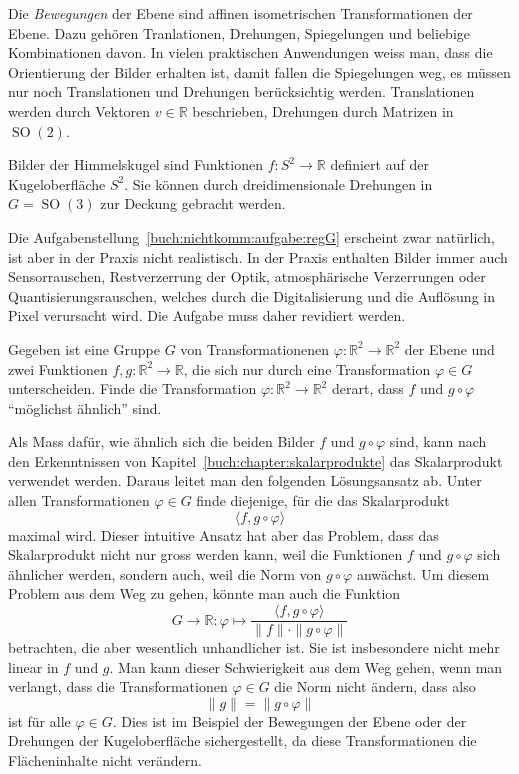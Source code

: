 \begin{beispiel}
Die {\em Bewegungen} der Ebene sind affinen isometrischen
%
Transformationen der Ebene.
Dazu gehören Tranlationen, Drehungen, Spiegelungen und beliebige
%
%
%
Kombinationen davon.
In vielen praktischen Anwendungen weiss man, dass die Orientierung
der Bilder erhalten ist, damit fallen die Spiegelungen weg, es
müssen nur noch Translationen und Drehungen berücksichtig werden.
Translationen werden durch Vektoren $v\in\mathbb{R}$ beschrieben,
Drehungen durch Matrizen in $\operatorname{SO}(2)$.
\end{beispiel}

\begin{beispiel}
Bilder der Himmelskugel sind Funktionen $f\colon S^2\to\mathbb{R}$
definiert auf der Kugeloberfläche $S^2$.
Sie können durch dreidimensionale Drehungen
in $G=\operatorname{SO}(3)$ zur Deckung gebracht werden.
\end{beispiel}

Die Aufgabenstellung~\ref{buch:nichtkomm:aufgabe:regG}
erscheint zwar natürlich, ist aber in der Praxis
nicht realistisch.
In der Praxis enthalten Bilder immer auch Sensorrauschen, Restverzerrung
der Optik, atmosphärische Verzerrungen oder Quantisierungsrauschen, welches
durch die Digitalisierung und die Auflösung in Pixel verursacht wird.
Die Aufgabe muss daher revidiert werden.

\begin{aufgabe}
\label{buch:nichtkomm:motivation:aufgabe:regGaehnlich}
Gegeben ist eine Gruppe $G$ von Transformationenen
$\varphi:\mathbb{R}^2 \to\mathbb{R}^2$ der Ebene und 
zwei Funktionen $f,g\colon\mathbb{R}^2\to\mathbb{R}$, die sich nur durch
eine Transformation $\varphi\in G$ unterscheiden.
Finde die Transformation $\varphi\colon\mathbb{R}^2\to\mathbb{R}^2$ derart,
dass $f$ und $g\circ \varphi$ ``möglichst ähnlich'' sind.
\end{aufgabe}

Als Mass dafür, wie ähnlich sich die beiden Bilder $f$ und
$g\circ\varphi$ sind, kann nach den Erkenntnissen von
Kapitel~\ref{buch:chapter:skalarprodukte} das Skalarprodukt
verwendet werden.
Daraus leitet man den folgenden Lösungsansatz ab.
Unter allen Transformationen $\varphi\in G$ finde diejenige,
für die das Skalarprodukt
\[
\langle f,g\circ \varphi\rangle
\]
maximal wird.
Dieser intuitive Ansatz hat aber das Problem, dass 
das Skalarprodukt nicht nur gross werden kann, weil die Funktionen
$f$ und $g\circ\varphi$ sich ähnlicher werden, sondern auch,
weil die Norm von $g\circ\varphi$ anwächst.
Um diesem Problem aus dem Weg zu gehen, könnte man auch 
die Funktion
\[
G\to\mathbb{R}
\colon
\varphi\mapsto
\frac{\langle f,g\circ \varphi\rangle}{\|f\|\cdot\|g\circ\varphi\|}
\]
betrachten, die aber wesentlich unhandlicher ist.
Sie ist insbesondere nicht mehr linear in $f$ und $g$.
Man kann dieser Schwierigkeit aus dem Weg gehen, wenn man
verlangt, dass die Transformationen $\varphi\in G$ die Norm nicht
ändern, dass also
\[
\|g\|
=
\|g\circ \varphi\|
\]
ist für alle $\varphi\in G$.
Dies ist im Beispiel der Bewegungen der Ebene oder der Drehungen
der Kugeloberfläche sichergestellt, da diese Transformationen
die Flächeninhalte nicht verändern.

